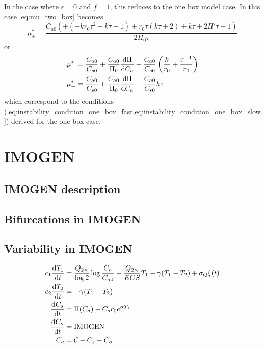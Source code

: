 In the case where $\epsilon = 0$ and $f = 1$, this reduces to the one box model case. In this case \cref{eq:mu_two_box} becomes
\begin{equation}
  \label{eq:mu_zero_one}
  \mu^*_{\pm} = \frac{C_{a0} \left(\pm\left(-k r_0 \tau ^2+k \tau +1\right)+r_0 \tau  (k \tau +2)+k \tau +2 \Pi' \tau +1\right)}{2 \Pi_0 \tau}
\end{equation}
or
\begin{align}
  \label{eq:mu_zero_one_cases}
  \mu_+^* &= \frac{C_{a0}}{C_{s0}} + \frac{C_{a0}}{\Pi_0}\dv{\Pi}{C_a} + \frac{C_{a0}}{C_{s0}} \left(\frac{k}{r_0} + \frac{\tau^{-1}}{r_0}\right) \\
  \mu_-^* &= \frac{C_{a0}}{C_{s0}} + \frac{C_{a0}}{\Pi_0}\dv{\Pi}{C_a} + \frac{C_{a0}}{C_{s0}}k\tau 
\end{align}
which correspond to the conditions (\cref{eq:instability_condition_one_box_fast,eq:instability_condition_one_box_slow}) derived for the one box case.


\section{IMOGEN}
\subsection{IMOGEN description}
\subsection{Bifurcations in IMOGEN}
\subsection{Variability in IMOGEN}
\begin{subequations}
  \label{eq:climate_system}
  \begin{align}
    c_1 \dv{T_1}{t} &= \frac{Q_{2\times}}{\log 2} \log \frac{C_a}{C_{a0}} - \frac{Q_{2\times}}{ECS}T_1 -\gamma (T_1 - T_2) + \sigma_Q \xi(t)\\
    c_2 \dv{T_2}{t} &= -\gamma(T_1 - T_2) \\
    \dv{C_s}{t}     &= \Pi(C_a) - C_s r_0 e^{\alpha T_1} \\
    \dv{C_o}{t}     &= \mathrm{IMOGEN} \\
    C_a &= \mathcal{C} - C_s - C_o
  \end{align}
\end{subequations}